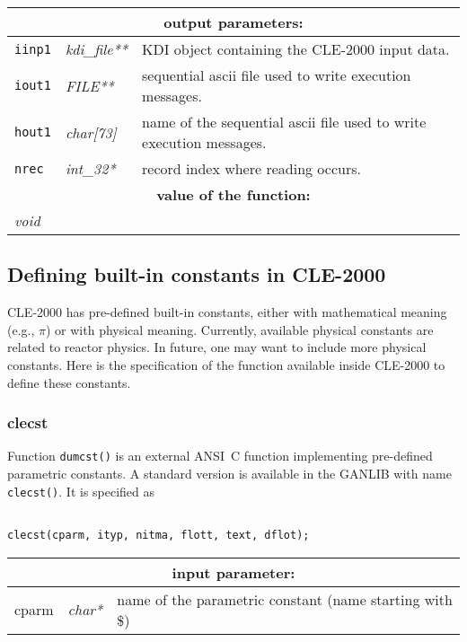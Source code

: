 \noindent
\begin{tabular}{|p{1.5cm}|p{2cm}|p{11cm}|}
\hline
\multicolumn{3}{|c|}{\bf output parameters:} \\
\hline
{\tt iinp1} & {\it kdi\_file**} & KDI object containing the CLE-2000 input data.\\
\hline
{\tt iout1} & {\it FILE**} & sequential {\sc ascii} file used to write execution messages. \\
\hline
{\tt hout1} & {\it char[73]} & name of the sequential {\sc ascii} file used to write execution messages. \\
\hline
{\tt nrec} & {\it int\_32*} & record index where reading occurs. \\
\hline
\multicolumn{3}{|c|}{\bf value of the function:} \\
\hline
\multicolumn{2}{|l|}{\it void} &  \\
\hline
\end{tabular}

\vskip 0.8cm

\subsection{Defining built-in constants in CLE-2000}

CLE-2000 has pre-defined built-in constants, either with mathematical meaning (e.g., $\pi$) or with physical meaning. Currently, available physical constants are
related to reactor physics. In future, one may want to include more physical constants. Here is the specification of the function available inside CLE-2000 to define these constants.

\subsubsection{clecst}

Function {\tt dumcst()} is an external ANSI~C function implementing pre-defined parametric constants. A standard version is available in the GANLIB with name {\tt clecst()}. It is specified as
\begin{verbatim}

clecst(cparm, ityp, nitma, flott, text, dflot);
\end{verbatim}

\vskip 0.8cm

\noindent
\begin{tabular}{|p{1.5cm}|p{2cm}|p{11cm}|}
\hline
\multicolumn{3}{|c|}{\bf input parameter:} \\
\hline
cparm & {\it char*} & name of the parametric constant (name starting with \$) \\
\hline
\end{tabular}

